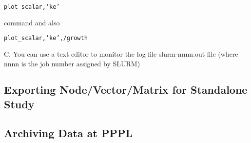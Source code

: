 \begin{verbatim}
plot_scalar,‘ke’
\end{verbatim}

\noindent
command and also 

\begin{verbatim}
plot_scalar,’ke’,/growth
\end{verbatim}

C. You can use a text editor to monitor the log file slurm-nnnn.out file (where nnnn is the job number assigned by SLURM)

\subsection{Exporting Node/Vector/Matrix for Standalone Study}
\subsection{Archiving Data at PPPL}

